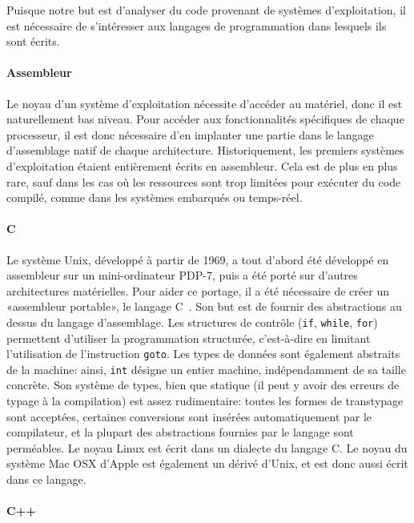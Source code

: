 Puisque notre but est d'analyser du code provenant de systèmes d'exploitation,
il est nécessaire de s'intéresser aux langages de programmation dans lesquels
ils sont écrits.

\paragraph{Assembleur}

Le noyau d'un système d'exploitation nécessite d'accéder au matériel, donc il
est naturellement bas niveau. Pour accéder aux fonctionnalités spécifiques de
chaque processeur, il est donc nécessaire d'en implanter une partie dans le
langage d'assemblage natif de chaque architecture. Historiquement, les premiers
systèmes d'exploitation étaient entièrement écrits en assembleur. Cela est de
plus en plus rare, sauf dans les cas où les ressources sont trop limitées pour
exécuter du code compilé, comme dans les systèmes embarqués ou temps-réel.

\paragraph{C}

Le système Unix, développé à partir de 1969, a tout d'abord été développé en
assembleur sur un mini-ordinateur PDP-7, puis a été porté sur d'autres
architectures matérielles. Pour aider ce portage, il a été nécessaire de créer
un «assembleur portable», le langage C~\cite{KandR,AnsiC}. Son but est de
fournir des abstractions au dessus du langage d'assemblage. Les structures de
contrôle (\texttt{if}, \texttt{while}, \texttt{for}) permettent d'utiliser la
programmation structurée, c'est-à-dire en limitant l'utilisation de
l'instruction \texttt{goto}. Les types de données sont également abstraits de la
machine: ainsi, \texttt{int} désigne un entier machine, indépendamment de sa
taille concrète. Son système de types, bien que statique (il peut y avoir des
erreurs de typage à la compilation) est assez rudimentaire: toutes les formes
de transtypage sont acceptées, certaines conversions sont insérées
automatiquement par le compilateur, et la plupart des abstractions fournies par
le langage sont perméables. Le noyau Linux est écrit dans un dialecte du langage
C. Le noyau du système Mac OSX d'Apple est également un dérivé d'Unix, et est
donc aussi écrit dans ce langage.

\paragraph{C++}

